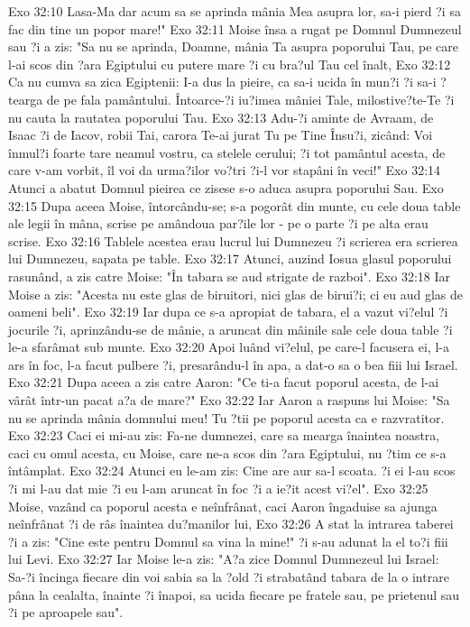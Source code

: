Exo 32:10  Lasa-Ma dar acum sa se aprinda mânia Mea asupra lor, sa-i pierd ?i sa fac din tine un popor mare!"
Exo 32:11  Moise însa a rugat pe Domnul Dumnezeul sau ?i a zis: "Sa nu se aprinda, Doamne, mânia Ta asupra poporului Tau, pe care l-ai scos din ?ara Egiptului cu putere mare ?i cu bra?ul Tau cel înalt,
Exo 32:12  Ca nu cumva sa zica Egiptenii: I-a dus la pieire, ca sa-i ucida în mun?i ?i sa-i ?tearga de pe fala pamântului. Întoarce-?i iu?imea mâniei Tale, milostive?te-Te ?i nu cauta la rautatea poporului Tau.
Exo 32:13  Adu-?i aminte de Avraam, de Isaac ?i de Iacov, robii Tai, carora Te-ai jurat Tu pe Tine Însu?i, zicând: Voi înmul?i foarte tare neamul vostru, ca stelele cerului; ?i tot pamântul acesta, de care v-am vorbit, îl voi da urma?ilor vo?tri ?i-l vor stapâni în veci!"
Exo 32:14  Atunci a abatut Domnul pieirea ce zisese s-o aduca asupra poporului Sau.
Exo 32:15  Dupa aceea Moise, întorcându-se; s-a pogorât din munte, cu cele doua table ale legii în mâna, scrise pe amândoua par?ile lor - pe o parte ?i pe alta erau scrise.
Exo 32:16  Tablele acestea erau lucrul lui Dumnezeu ?i scrierea era scrierea lui Dumnezeu, sapata pe table.
Exo 32:17  Atunci, auzind Iosua glasul poporului rasunând, a zis catre Moise: "În tabara se aud strigate de razboi".
Exo 32:18  Iar Moise a zis: "Acesta nu este glas de biruitori, nici glas de birui?i; ci eu aud glas de oameni beli".
Exo 32:19  Iar dupa ce s-a apropiat de tabara, el a vazut vi?elul ?i jocurile ?i, aprinzându-se de mânie, a aruncat din mâinile sale cele doua table ?i le-a sfarâmat sub munte.
Exo 32:20  Apoi luând vi?elul, pe care-l facusera ei, l-a ars în foc, l-a facut pulbere ?i, presarându-l în apa, a dat-o sa o bea fiii lui Israel.
Exo 32:21  Dupa aceea a zis catre Aaron: "Ce ti-a facut poporul acesta, de l-ai vârât într-un pacat a?a de mare?"
Exo 32:22  Iar Aaron a raspuns lui Moise: "Sa nu se aprinda mânia domnului meu! Tu ?tii pe poporul acesta ca e razvratitor.
Exo 32:23  Caci ei mi-au zis: Fa-ne dumnezei, care sa mearga înaintea noastra, caci cu omul acesta, cu Moise, care ne-a scos din ?ara Egiptului, nu ?tim ce s-a întâmplat.
Exo 32:24  Atunci eu le-am zis: Cine are aur sa-l scoata. ?i ei l-au scos ?i mi l-au dat mie ?i eu l-am aruncat în foc ?i a ie?it acest vi?el".
Exo 32:25  Moise, vazând ca poporul acesta e neînfrânat, caci Aaron îngaduise sa ajunga neînfrânat ?i de râs înaintea du?manilor lui,
Exo 32:26  A stat la intrarea taberei ?i a zis: "Cine este pentru Domnul sa vina la mine!" ?i s-au adunat la el to?i fiii lui Levi.
Exo 32:27  Iar Moise le-a zis: "A?a zice Domnul Dumnezeul lui Israel: Sa-?i încinga fiecare din voi sabia sa la ?old ?i strabatând tabara de la o intrare pâna la cealalta, înainte ?i înapoi, sa ucida fiecare pe fratele sau, pe prietenul sau ?i pe aproapele sau".
